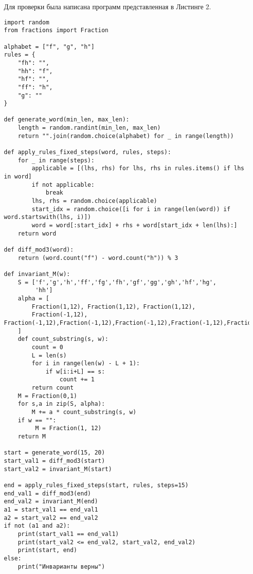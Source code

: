 \documentclass[a4paper, 14pt]{extarticle}
\begin{document}
Для проверки была написана программ представленная в Листинге 2.
\begin{lstlisting}
import random
from fractions import Fraction

alphabet = ["f", "g", "h"]
rules = {
    "fh": "",
    "hh": "f",
    "hf": "",
    "ff": "h",
    "g": ""
}

def generate_word(min_len, max_len):
    length = random.randint(min_len, max_len)
    return "".join(random.choice(alphabet) for _ in range(length))

def apply_rules_fixed_steps(word, rules, steps):
    for _ in range(steps):
        applicable = [(lhs, rhs) for lhs, rhs in rules.items() if lhs in word]
        if not applicable:
            break 
        lhs, rhs = random.choice(applicable)
        start_idx = random.choice([i for i in range(len(word)) if word.startswith(lhs, i)])
        word = word[:start_idx] + rhs + word[start_idx + len(lhs):]
    return word

def diff_mod3(word):
    return (word.count("f") - word.count("h")) % 3

def invariant_M(w):
    S = ['f','g','h','ff','fg','fh','gf','gg','gh','hf','hg',
         'hh']
    alpha = [
        Fraction(1,12), Fraction(1,12), Fraction(1,12),
        Fraction(-1,12), Fraction(-1,12),Fraction(-1,12),Fraction(-1,12),Fraction(-1,12),Fraction(-1,12),Fraction(-1,12),Fraction(-1,12),Fraction(-1,12)
    ]
    def count_substring(s, w):
        count = 0
        L = len(s)
        for i in range(len(w) - L + 1):
            if w[i:i+L] == s:
                count += 1
        return count
    M = Fraction(0,1)
    for s,a in zip(S, alpha):
        M += a * count_substring(s, w)
    if w == "":
         M = Fraction(1, 12)
    return M

start = generate_word(15, 20)
start_val1 = diff_mod3(start)
start_val2 = invariant_M(start)
    
end = apply_rules_fixed_steps(start, rules, steps=15)
end_val1 = diff_mod3(end)
end_val2 = invariant_M(end)
a1 = start_val1 == end_val1
a2 = start_val2 == end_val2
if not (a1 and a2):
    print(start_val1 == end_val1)
    print(start_val2 <= end_val2, start_val2, end_val2)
    print(start, end)
else:
    print("Инварианты верны")
\end{lstlisting}
\end{document}
